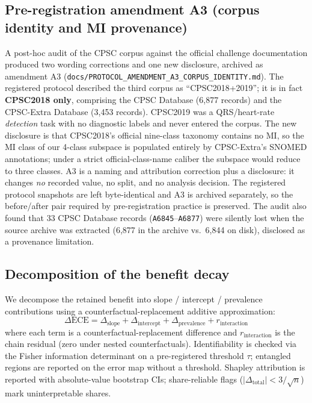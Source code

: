 \documentclass[review,12pt,nonatbib]{elsarticle}
\begin{document}
\subsection{Pre-registration amendment A3 (corpus identity and MI provenance)}
\label{sec:a3}
A post-hoc audit of the CPSC corpus against the official challenge
documentation produced two wording corrections and one new disclosure,
archived as amendment A3
(\texttt{docs/PROTOCOL\_AMENDMENT\_A3\_}\allowbreak\texttt{CORPUS\_IDENTITY.md}).
The registered protocol described the third corpus as
``CPSC2018+2019''; it is in fact \textbf{CPSC2018 only}, comprising the
CPSC Database (6,877 records) and the CPSC-Extra Database (3,453
records). CPSC2019 was a QRS/heart-rate \emph{detection} task with no
diagnostic labels and never entered the corpus. The new disclosure is
that CPSC2018's official nine-class taxonomy contains no MI, so the MI
class of our 4-class subspace is populated entirely by CPSC-Extra's
SNOMED annotations; under a strict official-class-name caliber the
subspace would reduce to three classes. A3 is a naming and attribution
correction plus a disclosure: it changes \emph{no} recorded value, no
split, and no analysis decision. The registered protocol snapshots are
left byte-identical and A3 is archived separately, so the
before/after pair required by pre-registration practice is preserved.
The audit also found that 33 CPSC Database records
(\texttt{A6845}--\texttt{A6877}) were silently lost when the source
archive was extracted (6,877 in the archive vs.\ 6,844 on disk),
disclosed as a provenance limitation.

\subsection{Decomposition of the benefit decay}
\label{sec:decomp}
We decompose the retained benefit into slope / intercept / prevalence
contributions using a counterfactual-replacement additive approximation:
\begin{equation}
    \Delta\text{ECE} = \Delta_{\text{slope}}
    + \Delta_{\text{intercept}}
    + \Delta_{\text{prevalence}}
    + r_{\text{interaction}}
\end{equation}
where each term is a counterfactual-replacement difference and
$r_{\text{interaction}}$ is the chain residual (zero under nested
counterfactuals). Identifiability is checked via the Fisher information
determinant on a pre-registered threshold $\tau$; entangled regions are
reported on the error map without a threshold. Shapley attribution is
reported with absolute-value bootstrap CIs; share-reliable flags
($|\Delta_{\text{total}}|<3/\sqrt{n}$) mark uninterpretable shares.
\end{document}
